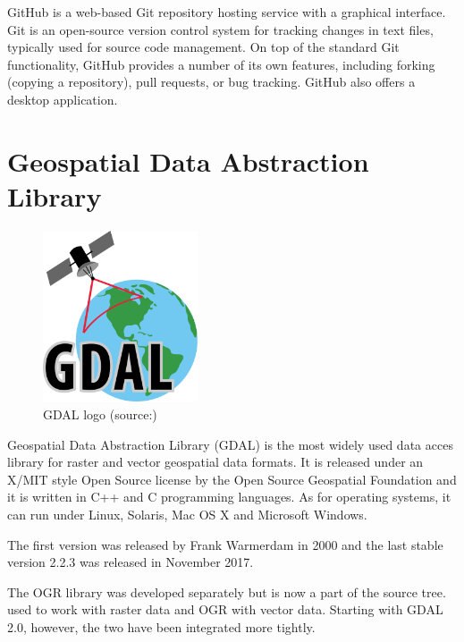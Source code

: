   GitHub is a web-based Git repository hosting service with a
  graphical interface. Git is an open-source version control system
  for tracking changes in text files, typically used for source code
  management.\cite{git} On top of the standard Git functionality,
  GitHub provides a number of its own features, including forking
  (copying a repository), pull requests, or bug tracking. GitHub also
  offers a desktop application.

\section{Geospatial Data Abstraction Library}

\begin{figure}[H] \centering
      \includegraphics[width=130pt]{./pictures/gdal.png}
      \caption[GDAL logo]{GDAL logo (source:{\cite{gdal}})}
      \label{fig:GDAL}
  \end{figure}

  Geospatial Data Abstraction Library (GDAL) is the most widely
  used data acces library for raster and vector geospatial
  data formats. It is released under an X/MIT style Open Source
  license by the Open Source Geospatial Foundation and it is written
  in C++ and C programming languages. As for operating systems, it can
  run under Linux, Solaris, Mac OS X and Microsoft Windows.\cite{gdal}

  The first version was released by Frank Warmerdam in 2000 and the
  last stable version 2.2.3 was released in November
  2017.\cite{gdalrelease}


  The OGR library was developed separately but is now a part of
  the  source tree.  used to work with raster data
  and OGR with vector data. Starting with GDAL 2.0, however, the two
  have been integrated more tightly.

